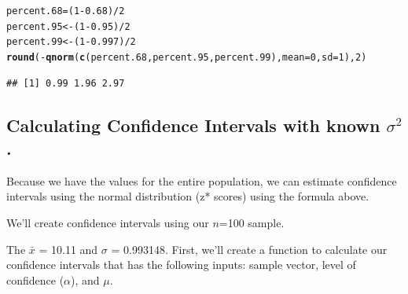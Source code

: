 \documentclass{tufte-handout}\usepackage[]{graphicx}\usepackage[]{color}
\makeatletter
\newcommand{\hlnum}[1]{\textcolor[rgb]{0.686,0.059,0.569}{#1}}%
\newcommand{\hlopt}[1]{\textcolor[rgb]{0,0,0}{#1}}%
\newcommand{\hlstd}[1]{\textcolor[rgb]{0.345,0.345,0.345}{#1}}%
\newcommand{\hlkwb}[1]{\textcolor[rgb]{0.69,0.353,0.396}{#1}}%
\newcommand{\hlkwc}[1]{\textcolor[rgb]{0.333,0.667,0.333}{#1}}%
\newcommand{\hlkwd}[1]{\textcolor[rgb]{0.737,0.353,0.396}{\textbf{#1}}}%
\newenvironment{kframe}{%
 \def\at@end@of@kframe{}%
 \ifinner\ifhmode%
  \def\at@end@of@kframe{\end{minipage}}%
  \begin{minipage}{\columnwidth}%
 \fi\fi%
 \def\FrameCommand##1{\hskip\@totalleftmargin \hskip-\fboxsep
 \colorbox{shadecolor}{##1}\hskip-\fboxsep
     \hskip-\linewidth \hskip-\@totalleftmargin \hskip\columnwidth}%
 \MakeFramed {\advance\hsize-\width
   \@totalleftmargin\z@ \linewidth\hsize
   \@setminipage}}%
 {\par\unskip\endMakeFramed%
 \at@end@of@kframe}
\newenvironment{knitrout}{}{} %
\makeatother
\begin{document}
\begin{knitrout}
\color{fgcolor}\begin{kframe}
\begin{alltt}
\hlstd{percent.68} \hlkwb{=} \hlstd{(}\hlnum{1} \hlopt{-} \hlnum{0.68}\hlstd{)}\hlopt{/}\hlnum{2}
\hlstd{percent.95} \hlkwb{<-} \hlstd{(}\hlnum{1} \hlopt{-} \hlnum{0.95}\hlstd{)}\hlopt{/}\hlnum{2}
\hlstd{percent.99} \hlkwb{<-} \hlstd{(}\hlnum{1} \hlopt{-} \hlnum{0.997}\hlstd{)}\hlopt{/}\hlnum{2}
\hlkwd{round}\hlstd{(}\hlopt{-}\hlkwd{qnorm}\hlstd{(}\hlkwd{c}\hlstd{(percent.68, percent.95, percent.99),} \hlkwc{mean}\hlstd{=}\hlnum{0}\hlstd{,} \hlkwc{sd}\hlstd{=}\hlnum{1}\hlstd{),} \hlnum{2}\hlstd{)}
\end{alltt}
\begin{verbatim}
## [1] 0.99 1.96 2.97
\end{verbatim}
\end{kframe}
\end{knitrout}


\subsection{Calculating Confidence Intervals with known $\sigma^2$.}

Because we have the values for the entire population, we can estimate confidence intervals using the normal distribution (z* scores) using the formula above. 

We'll create confidence intervals using our $n$=100 sample. 

The $\bar{x}$ = 10.11 and $\sigma$ = 0.993148. First, we'll create a function to calculate our confidence intervals that has the following inputs: sample vector, level of confidence ($\alpha$), and $\mu$.
\end{document}
